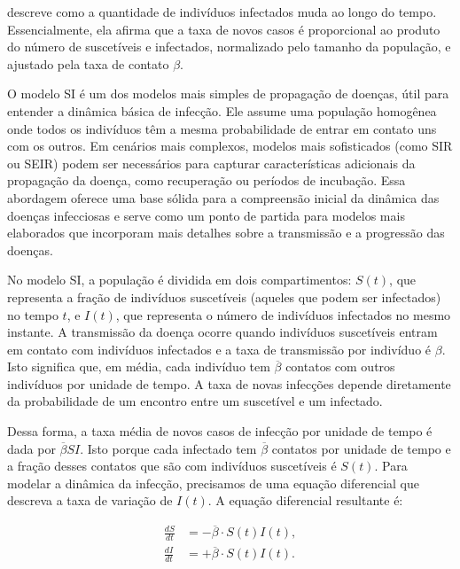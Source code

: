 descreve como a quantidade de indivíduos infectados muda ao longo do tempo. Essencialmente, ela afirma que a taxa de novos casos é proporcional ao produto do número de suscetíveis e infectados, normalizado pelo tamanho da população, e ajustado pela taxa de contato \(\beta\).

O modelo SI é um dos modelos mais simples de propagação de doenças, útil para entender a dinâmica básica de infecção. Ele assume uma população homogênea onde todos os indivíduos têm a mesma probabilidade de entrar em contato uns com os outros. Em cenários mais complexos, modelos mais sofisticados (como SIR ou SEIR) podem ser necessários para capturar características adicionais da propagação da doença, como recuperação ou períodos de incubação. Essa abordagem oferece uma base sólida para a compreensão inicial da dinâmica das doenças infecciosas e serve como um ponto de partida para modelos mais elaborados que incorporam mais detalhes sobre a transmissão e a progressão das doenças.

No modelo SI, a população é dividida em dois compartimentos: \(S(t)\), que representa a fração de indivíduos suscetíveis (aqueles que podem ser infectados) no tempo \(t\), e \(I(t)\), que representa o número de indivíduos infectados no mesmo instante. A transmissão da doença ocorre quando indivíduos suscetíveis entram em contato com indivíduos infectados e a taxa de transmissão por indivíduo é \(\beta\). Isto significa que, em média, cada indivíduo tem \(\overline{\beta}\) contatos com outros indivíduos por unidade de tempo. A taxa de novas infecções depende diretamente da probabilidade de um encontro entre um suscetível e um infectado.

Dessa forma, a taxa média de novos casos de infecção por unidade de tempo é dada por \(\overline{\beta} SI\). Isto porque cada infectado tem \(\overline{\beta}\) contatos por unidade de tempo e a fração desses contatos que são com indivíduos suscetíveis é \(S(t)\). Para modelar a dinâmica da infecção, precisamos de uma equação diferencial que descreva a taxa de variação de \(I(t)\). A equação diferencial resultante é:

\begin{align}
  \frac{dS}{dt} &= -\overline{\beta} \cdot S(t)I(t),\\
  \frac{dI}{dt} &= +\overline{\beta}\cdot S(t)I(t).
  \label{eq:SI2}
\end{align}


